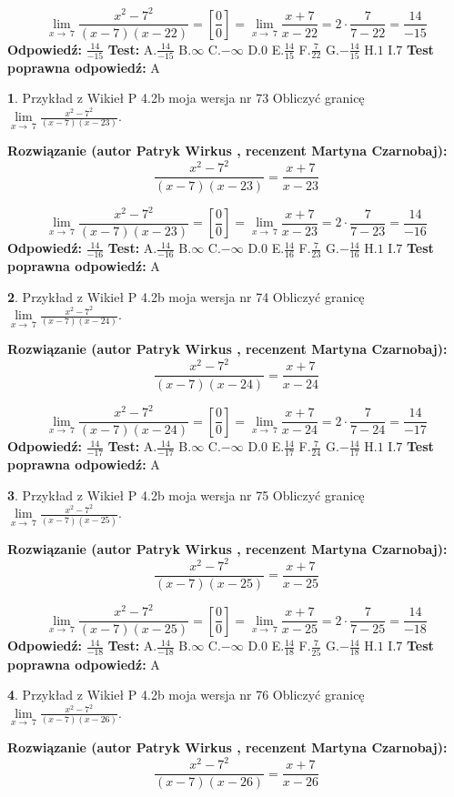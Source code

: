 \documentclass[12pt, a4paper]{article}
\theoremstyle{definition} %
\newtheorem{zad}{}
\newcommand{\zadStart}[1]{\begin{zad}#1\newline}
\newcommand{\zadStop}{\end{zad}}
\newcommand{\rozwStart}[2]{\noindent \textbf{Rozwiązanie (autor #1 , recenzent #2): }\newline}
\newcommand{\rozwStop}{\newline}
\newcommand{\odpStart}{\noindent \textbf{Odpowiedź:}\newline}
\newcommand{\odpStop}{\newline}
\newcommand{\testStart}{\noindent \textbf{Test:}\newline}
\newcommand{\testStop}{\newline}
\newcommand{\kluczStart}{\noindent \textbf{Test poprawna odpowiedź:}\newline}
\newcommand{\kluczStop}{\newline}
\begin{document}
$$\lim\limits_{x\to\ 7}\frac{x^{2}-7^{2}}{(x-7)(x-22)}=[\frac{0}{0}]=\lim\limits_{x\to\ 7}\frac{x+7}{x-22}=2 \cdot \frac{7}{7-22} = \frac{14}{-15}$$
\rozwStop
\odpStart
$\frac{14}{-15}$
\odpStop
\testStart
A.$\frac{14}{-15}$
B.$\infty$
C.$-\infty$
D.$0$
E.$\frac{14}{15}$
F.$\frac{7}{22}$
G.$-\frac{14}{15}$
H.$1$
I.$7$
\testStop
\kluczStart
A
\kluczStop



\zadStart{Przykład z Wikieł P 4.2b moja wersja nr 73}
Obliczyć granicę $\lim\limits_{x\to\ 7}\frac{x^{2}-7^{2}}{(x-7)(x-23)}$.
\zadStop
\rozwStart{Patryk Wirkus}{Martyna Czarnobaj}
$$\frac{x^{2}-7^{2}}{(x-7)(x-23)}=\frac{x+7}{x-23}$$

$$\lim\limits_{x\to\ 7}\frac{x^{2}-7^{2}}{(x-7)(x-23)}=[\frac{0}{0}]=\lim\limits_{x\to\ 7}\frac{x+7}{x-23}=2 \cdot \frac{7}{7-23} = \frac{14}{-16}$$
\rozwStop
\odpStart
$\frac{14}{-16}$
\odpStop
\testStart
A.$\frac{14}{-16}$
B.$\infty$
C.$-\infty$
D.$0$
E.$\frac{14}{16}$
F.$\frac{7}{23}$
G.$-\frac{14}{16}$
H.$1$
I.$7$
\testStop
\kluczStart
A
\kluczStop



\zadStart{Przykład z Wikieł P 4.2b moja wersja nr 74}
Obliczyć granicę $\lim\limits_{x\to\ 7}\frac{x^{2}-7^{2}}{(x-7)(x-24)}$.
\zadStop
\rozwStart{Patryk Wirkus}{Martyna Czarnobaj}
$$\frac{x^{2}-7^{2}}{(x-7)(x-24)}=\frac{x+7}{x-24}$$

$$\lim\limits_{x\to\ 7}\frac{x^{2}-7^{2}}{(x-7)(x-24)}=[\frac{0}{0}]=\lim\limits_{x\to\ 7}\frac{x+7}{x-24}=2 \cdot \frac{7}{7-24} = \frac{14}{-17}$$
\rozwStop
\odpStart
$\frac{14}{-17}$
\odpStop
\testStart
A.$\frac{14}{-17}$
B.$\infty$
C.$-\infty$
D.$0$
E.$\frac{14}{17}$
F.$\frac{7}{24}$
G.$-\frac{14}{17}$
H.$1$
I.$7$
\testStop
\kluczStart
A
\kluczStop



\zadStart{Przykład z Wikieł P 4.2b moja wersja nr 75}
Obliczyć granicę $\lim\limits_{x\to\ 7}\frac{x^{2}-7^{2}}{(x-7)(x-25)}$.
\zadStop
\rozwStart{Patryk Wirkus}{Martyna Czarnobaj}
$$\frac{x^{2}-7^{2}}{(x-7)(x-25)}=\frac{x+7}{x-25}$$

$$\lim\limits_{x\to\ 7}\frac{x^{2}-7^{2}}{(x-7)(x-25)}=[\frac{0}{0}]=\lim\limits_{x\to\ 7}\frac{x+7}{x-25}=2 \cdot \frac{7}{7-25} = \frac{14}{-18}$$
\rozwStop
\odpStart
$\frac{14}{-18}$
\odpStop
\testStart
A.$\frac{14}{-18}$
B.$\infty$
C.$-\infty$
D.$0$
E.$\frac{14}{18}$
F.$\frac{7}{25}$
G.$-\frac{14}{18}$
H.$1$
I.$7$
\testStop
\kluczStart
A
\kluczStop



\zadStart{Przykład z Wikieł P 4.2b moja wersja nr 76}
Obliczyć granicę $\lim\limits_{x\to\ 7}\frac{x^{2}-7^{2}}{(x-7)(x-26)}$.
\zadStop
\rozwStart{Patryk Wirkus}{Martyna Czarnobaj}
$$\frac{x^{2}-7^{2}}{(x-7)(x-26)}=\frac{x+7}{x-26}$$
\end{document}
